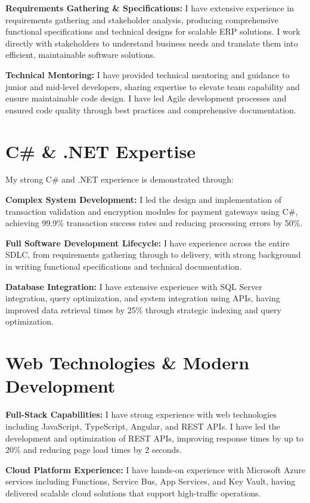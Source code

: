 \documentclass[letterpaper,10pt]{article}
\begin{document}
\textbf{Requirements Gathering \& Specifications:} I have extensive experience in requirements gathering and stakeholder analysis, producing comprehensive functional specifications and technical designs for scalable ERP solutions. I work directly with stakeholders to understand business needs and translate them into efficient, maintainable software solutions.

\textbf{Technical Mentoring:} I have provided technical mentoring and guidance to junior and mid-level developers, sharing expertise to elevate team capability and ensure maintainable code design. I have led Agile development processes and ensured code quality through best practices and comprehensive documentation.

\section{C\# \& .NET Expertise}

My strong C\# and .NET experience is demonstrated through:

\textbf{Complex System Development:} I led the design and implementation of transaction validation and encryption modules for payment gateways using C\#, achieving 99.9\% transaction success rates and reducing processing errors by 50\%.

\textbf{Full Software Development Lifecycle:} I have experience across the entire SDLC, from requirements gathering through to delivery, with strong background in writing functional specifications and technical documentation.

\textbf{Database Integration:} I have extensive experience with SQL Server integration, query optimization, and system integration using APIs, having improved data retrieval times by 25\% through strategic indexing and query optimization.

\section{Web Technologies \& Modern Development}

\textbf{Full-Stack Capabilities:} I have strong experience with web technologies including JavaScript, TypeScript, Angular, and REST APIs. I have led the development and optimization of REST APIs, improving response times by up to 20\% and reducing page load times by 2 seconds.

\textbf{Cloud Platform Experience:} I have hands-on experience with Microsoft Azure services including Functions, Service Bus, App Services, and Key Vault, having delivered scalable cloud solutions that support high-traffic operations.
\end{document}
